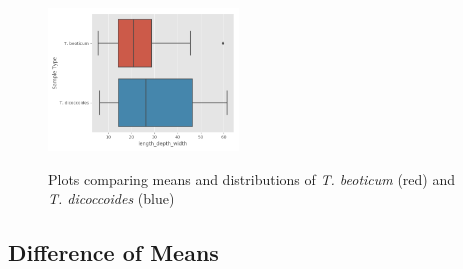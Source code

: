 \documentclass[11pt]{report}
\begin{document}
\begin{figure}[!ht]
{    \includegraphics[width=0.45\textwidth]{./images/results/group4/length_depth_width.png}
    }
  \caption{Plots comparing means and distributions of \textit{T. beoticum} (red) and \textit{T. dicoccoides} (blue)}
  \label{fig:dummy}
\end{figure}
\clearpage
\subsection{Difference of Means}
\label{sec:orga616120}
\end{document}
